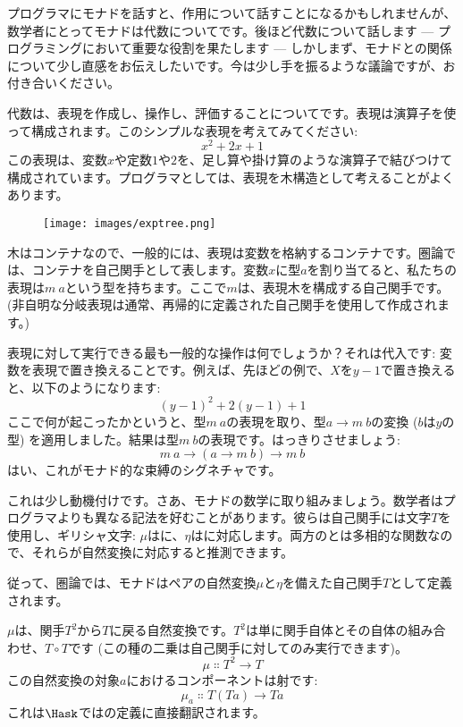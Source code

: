 
\lettrine[lhang=0.17]{プ}{ログラマ}にモナドを話すと、作用について話すことになるかもしれませんが、数学者にとってモナドは代数についてです。後ほど代数について話します --- プログラミングにおいて重要な役割を果たします --- しかしまず、モナドとの関係について少し直感をお伝えしたいです。今は少し手を振るような議論ですが、お付き合いください。

代数は、表現を作成し、操作し、評価することについてです。表現は演算子を使って構成されます。このシンプルな表現を考えてみてください: 
\[x^2 + 2 x + 1\]
この表現は、変数$x$や定数$1$や$2$を、足し算や掛け算のような演算子で結びつけて構成されています。プログラマとしては、表現を木構造として考えることがよくあります。

\begin{figure}[H]
  \centering
  \texttt{[image: images/exptree.png]}
\end{figure}

\noindent
木はコンテナなので、一般的には、表現は変数を格納するコンテナです。圏論では、コンテナを自己関手として表します。変数$x$に型$a$を割り当てると、私たちの表現は$m\ a$という型を持ちます。ここで$m$は、表現木を構成する自己関手です。(非自明な分岐表現は通常、再帰的に定義された自己関手を使用して作成されます。)

表現に対して実行できる最も一般的な操作は何でしょうか？それは代入です: 変数を表現で置き換えることです。例えば、先ほどの例で、$X$を$y - 1$で置き換えると、以下のようになります: 
\[(y - 1)^2 + 2 (y - 1) + 1\]
ここで何が起こったかというと、型$m\ a$の表現を取り、型$a \to m\ b$の変換 ($b$は$y$の型) を適用しました。結果は型$m\ b$の表現です。はっきりさせましょう: 
\[m\ a \to (a \to m\ b) \to m\ b\]
はい、これがモナド的な束縛のシグネチャです。

これは少し動機付けです。さあ、モナドの数学に取り組みましょう。数学者はプログラマよりも異なる記法を好むことがあります。彼らは自己関手には文字$T$を使用し、ギリシャ文字: $\mu$はに、$\eta$はに対応します。両方のとは多相的な関数なので、それらが自然変換に対応すると推測できます。

従って、圏論では、モナドはペアの自然変換$\mu$と$\eta$を備えた自己関手$T$として定義されます。

$\mu$は、関手$T^2$から$T$に戻る自然変換です。$T^2$は単に関手自体とその自体の組み合わせ、$T \circ T$です (この種の二乗は自己関手に対してのみ実行できます)。
\[\mu \Colon T^2 \to T\]
この自然変換の対象$a$におけるコンポーネントは射です: 
\[\mu_a \Colon T (T a) \to T a\]
これは$\Hask$ではの定義に直接翻訳されます。

